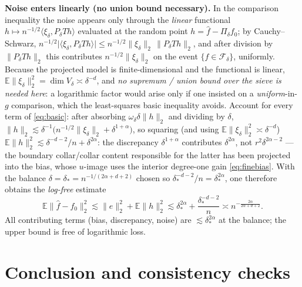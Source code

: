 \documentclass[11pt]{article}
\theoremstyle{remark}
\newcommand{\E}{\mathbb{E}}
\newcommand{\F}{\mathcal{F}}
\newcommand{\norm}[1]{\lVert #1\rVert}
\newcommand{\abs}[1]{\lvert #1\rvert}
\newcommand{\inner}[2]{\langle #1,#2\rangle}
\newcommand{\SET}[1]{\{#1\}}
\begin{document}
\par\noindent\textbf{Noise enters linearly (no union bound necessary).} In the
comparison inequality the noise appears only through the \emph{linear}
functional $h\mapsto n^{-1/2}\inner{\xi_\delta}{P_\delta Th}$ evaluated at
the random point $h=\widehat f-\Pi_\delta f_0$; by Cauchy--Schwarz,
$n^{-1/2}\abs{\inner{\xi_\delta}{P_\delta Th}}\le
n^{-1/2}\norm{\xi_\delta}_2\,\norm{P_\delta Th}_2$, and after division by
$\norm{P_\delta Th}_2$ this contributes $n^{-1/2}\norm{\xi_\delta}_2$ on
the event $\SET{\widehat f\in\F_\delta}$, uniformly. Because the projected
model is finite-dimensional and the functional is linear,
$\E\norm{\xi_\delta}_2^2=\dim V_\delta\asymp\delta^{-d}$, and \emph{no
supremum / union bound over the sieve is needed here}: a logarithmic factor
would arise only if one insisted on a \emph{uniform}-in-$g$ comparison,
which the least-squares basic inequality avoids. Account for every term
of \eqref{eq:basic}: after absorbing $\omega_\delta\delta\norm h_2$ and
dividing by $\delta$, $\norm h_2\lesssim\delta^{-1}\bigl(n^{-1/2}
\norm{\xi_\delta}_2+\delta^{1+\alpha}\bigr)$, so squaring (and using
$\E\norm{\xi_\delta}_2^2\asymp\delta^{-d}$)
$\E\norm h_2^2\lesssim\delta^{-d-2}/n+\delta^{2\alpha}$: the
discrepancy $\delta^{1+\alpha}$ contributes $\delta^{2\alpha}$, not
$r^{2}\delta^{2\alpha-2}$ --- the boundary collar/collar content
responsible for the latter has been projected into the bias, whose
$u$-image uses the interior degree-one gain \eqref{eq:finebias}. With
the balance
$\delta=\delta_*=n^{-1/(2\alpha+d+2)}$ chosen so
$\delta_*^{-d-2}/n=\delta_*^{2\alpha}$, one therefore obtains the
\emph{log-free} estimate
\[
\E\norm{\widehat f-f_0}_2^{2}
\lesssim\norm{e}_2^{2}+\E\norm{h}_2^{2}
\lesssim\delta_*^{2\alpha}+\frac{\delta_*^{-d-2}}{n}
\asymp n^{-\frac{2\alpha}{2\alpha+d+2}} .
\]
All contributing terms (bias, discrepancy, noise) are
$\lesssim\delta_*^{2\alpha}$ at the balance; the upper bound is free of
logarithmic loss.

\section{Conclusion and consistency checks}
\end{document}
